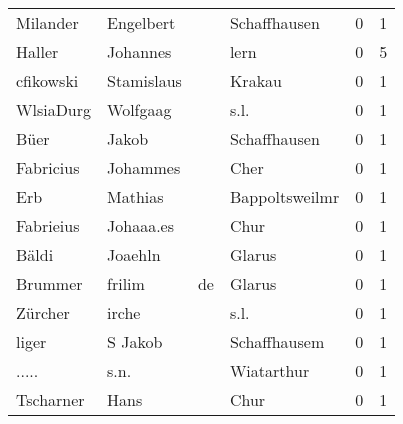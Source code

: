 \begin{tabular}{llllrr}
                 Milander &                          Engelbert &             &                                Schaffhausen &          0 &         1 \\
                   Haller &                           Johannes &             &                                        lern &          0 &         5 \\
                cfikowski &                         Stamislaus &             &                                      Krakau &          0 &         1 \\
                WlsiaDurg &                           Wolfgaag &             &                                        s.l. &          0 &         1 \\
                     Büer &                              Jakob &             &                                Schaffhausen &          0 &         1 \\
                Fabricius &                           Johammes &             &                                        Cher &          0 &         1 \\
                      Erb &                            Mathias &             &                              Bappoltsweilmr &          0 &         1 \\
                Fabrieius &                          Johaaa.es &             &                                        Chur &          0 &         1 \\
                    Bäldi &                            Joaehln &             &                                      Glarus &          0 &         1 \\
                  Brummer &                             frilim &          de &                                      Glarus &          0 &         1 \\
                  Zürcher &                              irche &             &                                        s.l. &          0 &         1 \\
                    liger &                            S Jakob &             &                                Schaffhausem &          0 &         1 \\
                    ..... &                               s.n. &             &                                  Wiatarthur &          0 &         1 \\
                Tscharner &                               Hans &             &                                        Chur &          0 &         1 \\

\end{tabular}

